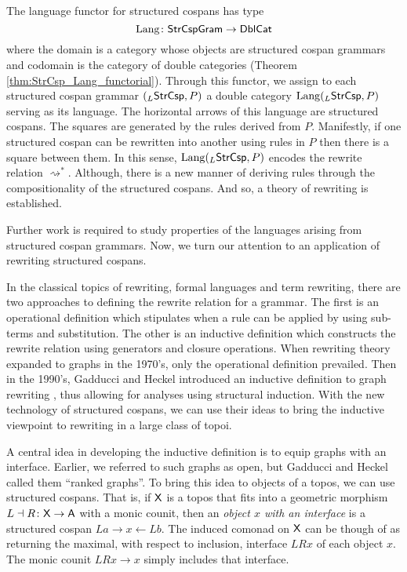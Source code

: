 \documentclass{amsart}
\begin{document}
The language functor for structured cospans has
type
$$ \mathrm{Lang} \colon \mathsf{StrCspGram} \to \mathsf{DblCat} $$ where the
domain is a category whose objects are structured
cospan grammars and codomain is the category of
double categories (Theorem
\ref{thm:StrCsp_Lang_functorial}). Through this
functor, we assign to each structured cospan
grammar $ ( _L\mathsf{StrCsp},P ) $ a double category
$ \mathrm{Lang} (_L\mathsf{StrCsp}, P) $ serving as its
language. The horizontal arrows of this language
are structured cospans.  The squares are generated
by the rules derived from $ P $. Manifestly, if
one structured cospan can be rewritten into
another using rules in $ P $ then there is a
square between them.  In this sense,
$ \mathrm{Lang} (_L\mathsf{StrCsp} , P) $ encodes the rewrite
relation $ \rightsquigarrow^\ast $.  Although,
there is a new manner of deriving rules through
the compositionality of the structured cospans.
And so, a theory of rewriting is established.

Further work is required to study properties of
the languages arising from structured cospan
grammars. Now, we turn our attention to an
application of rewriting structured cospans.

In the classical topics of rewriting, formal
languages and term rewriting, there are two
approaches to defining the rewrite relation for a
grammar. The first is an operational definition
which stipulates when a rule can be applied by
using sub-terms and substitution.  The other is an
inductive definition which constructs the rewrite
relation using generators and closure
operations. When rewriting theory expanded to
graphs in the 1970's, only the operational
definition prevailed.  Then in the 1990's, Gadducci
and Heckel introduced an inductive definition to
graph rewriting
\cite{Gadd_IndGraphTrans}, thus allowing for
analyses using structural induction. With the new
technology of structured cospans, we can use their
ideas to bring the inductive viewpoint to
rewriting in a large class of topoi.

A central idea in developing the inductive
definition is to equip graphs with an
interface. Earlier, we referred to such graphs as
open, but Gadducci and Heckel called them ``ranked
graphs''.  To bring this idea to objects of a
topos, we can use structured cospans. That is, if
$ \mathsf{X} $ is a topos that fits into a geometric
morphism $ L \dashv R \colon \mathsf{X} \to \mathsf{A} $ with a
monic counit, then an \emph{object $ x $ with an
interface} is a structured cospan $ La \to x \gets
Lb$. The induced comonad on $ \mathsf{X} $ can be though
of as returning the maximal, with respect to
inclusion, interface $ LRx $ of each object $ x
$. The monic counit $ LRx \to x $ simply includes
that interface.
\end{document}

